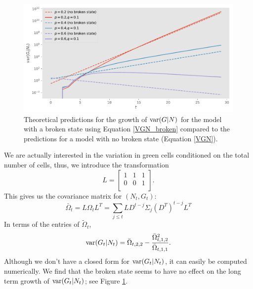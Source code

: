 \documentclass{article}
\begin{document}
 
\begin{figure}[h!]
\centering
\includegraphics[scale=0.6]{figS2.pdf}
\caption{ Theoretical predictions for the growth of ${\rm var}(G|N)$ for the model with a broken state using Equation \ref{VGN_broken} compared to the predictions for a model with no broken state (Equation \ref{VGN}).  }\label{fig:S2}
\end{figure}

 We are actually interested in the variation in green cells conditioned on the total number of cells, thus, we introduce the transformation 
 \begin{equation}
 L = \left[ \begin{array}{ccc}
1  & 1 &1 \\
0  & 0& 1 \\
\end{array}\right].
 \end{equation} 
 This gives us the covariance matrix for $(N_t,G_t)$:
 \begin{equation}
  \bar{\Omega}_{t} =L\Omega_t L^T =  \sum_{j\le t}LD^{t-j}\Sigma_j \left(D^T\right)^{t-j}L^T
 \end{equation}
 In terms of the entries of $ \tilde{\Omega}_{t}$, 
 \begin{equation}\label{VGN_broken}
 {\rm var}(G_t|N_t) = \bar{\Omega}_{t,2,2} - \frac{\bar{\Omega}_{t,1,2}^2}{ \bar{\Omega}_{t,1,1} }. 
 \end{equation}
Although we don't have a closed form for ${\rm var}(G_t|N_t)$, it can easily be computed numerically. We find that the broken state seems to have no effect on the long term growth of  ${\rm var}(G_t|N_t)$; see Figure \ref{fig:S2}. 








\end{document}
